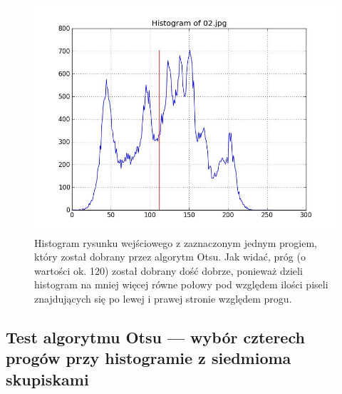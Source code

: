 \documentclass[10pt]{llncs}
\begin{document}
\begin{figure}[h!]
  \centering
  \includegraphics[scale=.3, clip]{img/03_histogram.jpg}
	\caption[]
  {Histogram rysunku wejściowego z zaznaczonym jednym progiem, który został dobrany przez algorytm Otsu. Jak widać, próg (o wartości ok. 120) został dobrany dość dobrze, ponieważ dzieli histogram na mniej więcej równe połowy pod względem ilości piseli znajdujących się po lewej i prawej stronie względem progu.}
\end{figure}

\subsection{Test algorytmu Otsu --- wybór czterech progów przy histogramie z siedmioma skupiskami}
\end{document}
